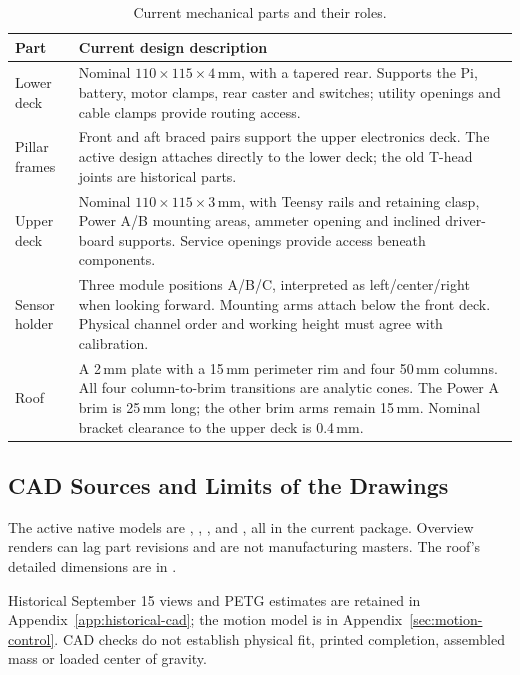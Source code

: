 \begin{table}[H]
\centering\small
\caption{Current mechanical parts and their roles.}
\label{tab:current-mechanics}
\begin{tabular}{@{}L{3.2cm}L{13.0cm}@{}}
\toprule
Part & Current design description \\
\midrule
Lower deck & Nominal $110\times115\times4$\,mm, with a tapered rear. Supports the Pi, battery, motor clamps, rear caster and switches; utility openings and cable clamps provide routing access. \\
Pillar frames & Front and aft braced pairs support the upper electronics deck. The active design attaches directly to the lower deck; the old T-head joints are historical parts. \\
Upper deck & Nominal $110\times115\times3$\,mm, with Teensy rails and retaining clasp, Power A/B mounting areas, ammeter opening and inclined driver-board supports. Service openings provide access beneath components. \\
Sensor holder & Three module positions A/B/C, interpreted as left/center/right when looking forward. Mounting arms attach below the front deck. Physical channel order and working height must agree with calibration. \\
Roof & A 2\,mm plate with a 15\,mm perimeter rim and four 50\,mm columns. All four column-to-brim transitions are analytic cones. The Power A brim is 25\,mm long; the other brim arms remain 15\,mm. Nominal bracket clearance to the upper deck is 0.4\,mm. \\
\bottomrule
\end{tabular}
\end{table}

\subsection{CAD Sources and Limits of the Drawings}
\label{sec:cad-visualization}
The active native models are , , ,  and , all in the current package. Overview renders can lag part revisions and are not manufacturing masters. The roof's detailed dimensions are in .

Historical September 15 views and PETG estimates are retained in Appendix~\ref{app:historical-cad}; the motion model is in Appendix~\ref{sec:motion-control}. CAD checks do not establish physical fit, printed completion, assembled mass or loaded center of gravity.
